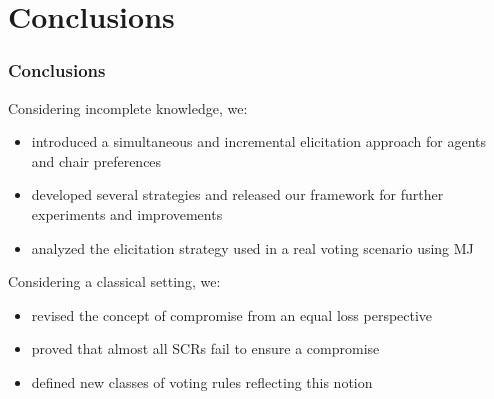 \documentclass[aspectratio=169]{beamer}
\begin{document}
\section{Conclusions}
\begin{frame}
	\frametitle{Conclusions}
\begin{block}{Considering incomplete knowledge, we:}
	\begin{itemize}
	\item introduced a simultaneous and incremental elicitation approach for agents and chair preferences
	\item developed several strategies and released our framework for further experiments and improvements
	\item analyzed the elicitation strategy used in a real voting scenario using MJ
	\end{itemize}
\end{block}
\begin{block}{Considering a classical setting, we:}
	\begin{itemize}
		\item revised the concept of compromise from an equal loss perspective
		\item proved that almost all SCRs fail to ensure a compromise
		\item defined new classes of voting rules reflecting this notion
	\end{itemize}
\end{block}
\end{frame}
\end{document}
